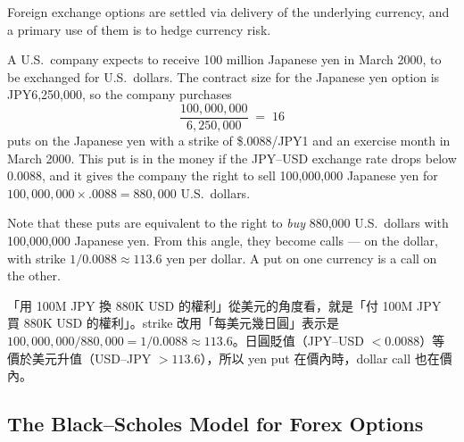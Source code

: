 \suppstart
{}
\suppend


Foreign exchange options are settled via delivery of the underlying currency, and a primary use of them is to hedge currency risk.

\suppstart
{}
\suppend

\begin{eg}
	A U.S.\ company expects to receive 100 million Japanese yen in March 2000, to be exchanged for U.S.\ dollars.
	The contract size for the Japanese yen option is JPY6,250,000, so the company purchases
	\[
		\frac{100{,}000{,}000}{6{,}250{,}000} \;=\; 16
	\]
	puts on the Japanese yen with a strike of \$.0088/JPY1 and an exercise month in March 2000.
	This put is in the money if the JPY--USD exchange rate drops below 0.0088, and it gives the company the right to sell 100,000,000 Japanese yen for $100{,}000{,}000\times.0088=880{,}000$ U.S.\ dollars.
\end{eg}

\suppstart
{}
\suppend

Note that these puts are equivalent to the right to \emph{buy} 880,000 U.S.\ dollars with 100,000,000 Japanese yen.
From this angle, they become calls --- on the dollar, with strike $1/0.0088\approx113.6$ yen per dollar.
\suppstart
A put on one currency is a call on the other.


\begin{remark}
	「用 100M JPY 換 880K USD 的權利」從美元的角度看，就是「付 100M JPY 買 880K USD 的權利」。strike 改用「每美元幾日圓」表示是 $100{,}000{,}000/880{,}000=1/0.0088\approx113.6$。日圓貶值（JPY--USD $<0.0088$）等價於美元升值（USD--JPY $>113.6$），所以 yen put 在價內時，dollar call 也在價內。
\end{remark}
\suppend

\subsection{The Black--Scholes Model for Forex Options}

